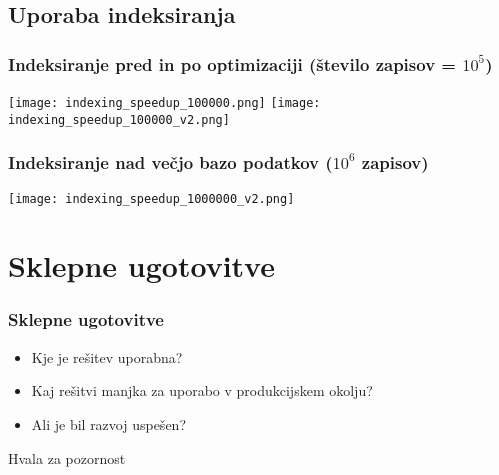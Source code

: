 \documentclass{beamer}
\begin{document}
    \subsection{Uporaba indeksiranja}
    \begin{frame}
        \frametitle{Indeksiranje pred in po optimizaciji (število zapisov = $10^5$)}
            \centering
            \texttt{[image: indexing\_speedup\_100000.png]}
            \vline
            \texttt{[image: indexing\_speedup\_100000\_v2.png]}
    \end{frame}

    \begin{frame}
        \frametitle{Indeksiranje nad večjo bazo podatkov ($10^6$ zapisov)}
            \centering
            \texttt{[image: indexing\_speedup\_1000000\_v2.png]}
    \end{frame}

\section{Sklepne ugotovitve}
\begin{frame}
\frametitle{Sklepne ugotovitve}
    \begin{itemize}
        \item Kje je rešitev uporabna?
        \item Kaj rešitvi manjka za uporabo v produkcijskem okolju?
        \item Ali je bil razvoj uspešen?
    \end{itemize}
\end{frame}


\begin{frame}
\Huge{\centerline{Hvala za pozornost}}
\end{frame}

\end{document}

